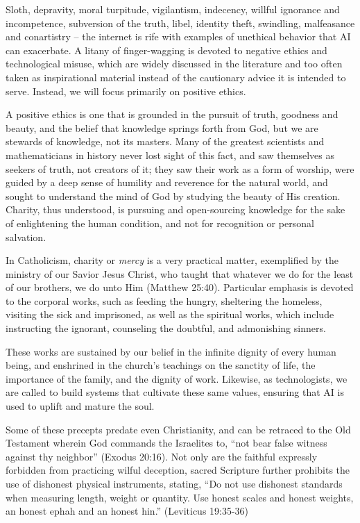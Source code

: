 \documentclass[sigplan,nonacm]{acmart}\settopmatter{printfolios=false,printccs=false,printacmref=false}
\begin{document}
Sloth, depravity, moral turpitude, vigilantism, indecency, willful ignorance and incompetence, subversion of the truth, libel, identity theft, swindling, malfeasance and conartistry -- the internet is rife with examples of unethical behavior that AI can exacerbate. A litany of finger-wagging is devoted to negative ethics and technological misuse, which are widely discussed in the literature and too often taken as inspirational material instead of the cautionary advice it is intended to serve. Instead, we will focus primarily on positive ethics.

A positive ethics is one that is grounded in the pursuit of truth, goodness and beauty, and the belief that knowledge springs forth from God, but we are stewards of knowledge, not its masters. Many of the greatest scientists and mathematicians in history never lost sight of this fact, and saw themselves as seekers of truth, not creators of it; they saw their work as a form of worship, were guided by a deep sense of humility and reverence for the natural world, and sought to understand the mind of God by studying the beauty of His creation. Charity, thus understood, is pursuing and open-sourcing knowledge for the sake of enlightening the human condition, and not for recognition or personal salvation.


In Catholicism, charity or \textit{mercy} is a very practical matter, exemplified by the ministry of our Savior Jesus Christ, who taught that whatever we do for the least of our brothers, we do unto Him (Matthew 25:40). Particular emphasis is devoted to the corporal works, such as feeding the hungry, sheltering the homeless, visiting the sick and imprisoned, as well as the spiritual works, which include instructing the ignorant, counseling the doubtful, and admonishing sinners.

These works are sustained by our belief in the infinite dignity of every human being, and enshrined in the church's teachings on the sanctity of life, the importance of the family, and the dignity of work. Likewise, as technologists, we are called to build systems that cultivate these same values, ensuring that AI is used to uplift and mature the soul.

Some of these precepts predate even Christianity, and can be retraced to the Old Testament wherein God commands the Israelites to, ``not bear false witness against thy neighbor'' (Exodus 20:16). Not only are the faithful expressly forbidden from practicing wilful deception, sacred Scripture further prohibits the use of dishonest physical instruments, stating, ``Do not use dishonest standards when measuring length, weight or quantity. Use honest scales and honest weights, an honest ephah and an honest hin.'' (Leviticus 19:35-36)%
\end{document}

